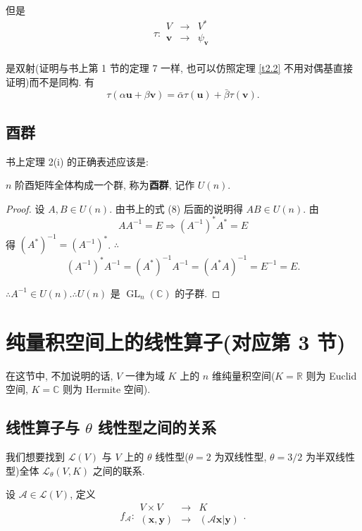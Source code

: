 \documentclass{ctexart}
\begin{document}
但是
\[\tau:\begin{array}{rcl}
    V & \to & V^* \\
    \boldsymbol{v} & \to & \psi_{\boldsymbol{v}} \\
\end{array}\]

是双射(证明与书上第 1 节的定理 7 一样, 也可以仿照定理 \ref{t2.2} 不用对偶基直接证明)而不是同构. 有
\[\tau(\alpha\boldsymbol{u}+\beta\boldsymbol{v})=\bar{\alpha}\tau(\boldsymbol{u})+\bar{\beta}\tau(\boldsymbol{v}).\]
\subsection{酉群}
书上定理 2(i) 的正确表述应该是:
\begin{theorem}
    $n$ 阶酉矩阵全体构成一个群, 称为\textbf{酉群}, 记作 $U(n)$.
\end{theorem}
\begin{proof}
    设 $A,B\in U(n)$. 由书上的式 (8) 后面的说明得 $AB\in U(n)$. 由
    \[AA^{-1}=E\Rightarrow(A^{-1})^*A^*=E\]
    得 $(A^*)^{-1}=(A^{-1})^*$. $\therefore$
    \[(A^{-1})^*A^{-1}=(A^*)^{-1}A^{-1}=(A^*A)^{-1}=E^{-1}=E.\]

    $\therefore A^{-1}\in U(n).\therefore U(n)$ 是 $\operatorname{GL}_n(\mathbb{C})$ 的子群.
\end{proof}
\section{纯量积空间上的线性算子(对应第 3 节)}
在这节中, 不加说明的话, $V$ 一律为域 $K$ 上的 $n$ 维纯量积空间($K=\mathbb{R}$ 则为 Euclid 空间, $K=\mathbb{C}$ 则为 Hermite 空间).
\subsection{线性算子与 $\theta$ 线性型之间的关系}
我们想要找到 $\mathcal{L}(V)$ 与 $V$ 上的 $\theta$ 线性型($\theta=2$ 为双线性型, $\theta=3/2$ 为半双线性型)全体 $\mathcal{L}_\theta(V,K)$ 之间的联系.

设 $\mathcal{A}\in\mathcal{L}(V)$, 定义
\[f_{\mathcal{A}}:\begin{array}{rcl}
    V\times V & \to & K \\
    (\boldsymbol{x},\boldsymbol{y}) & \to & (\mathcal{A}\boldsymbol{x}|\boldsymbol{y}) \\
\end{array}.\]
\end{document}
